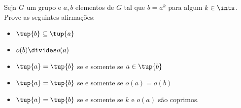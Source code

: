 \begin{exercise}
	Seja $G$ um grupo e $a, b$ elementos de $G$ tal que $b = a^k$ para algum $k \in \ints$.
	Prove as seguintes afirmações:
	\begin{itemize}
		\item $\tup{b} \subseteq \tup{a}$
		\item $o(b) \divides o(a)$
		\item $\tup{a} = \tup{b}$ se e somente se $a \in \tup{b}$ 
		\item $\tup{a} = \tup{b}$ se e somente se $o(a) = o(b)$
		\item $\tup{a} = \tup{b}$ se e somente se $k$ e $o(a)$ são coprimos.	
	\end{itemize}
\end{exercise}
